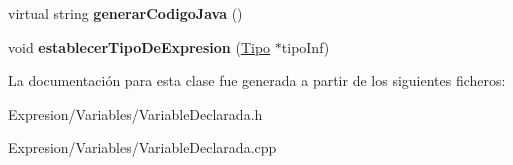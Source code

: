 \begin{DoxyCompactItemize}
\item 
\hypertarget{class_variable_declarada_ace4e1746ca3ebe6fe6a5c45fe2d7314f}{virtual string {\bfseries generar\-Codigo\-Java} ()}\label{class_variable_declarada_ace4e1746ca3ebe6fe6a5c45fe2d7314f}

\item 
\hypertarget{class_variable_declarada_af535502eb197a370d59e91da12fd7f96}{void {\bfseries establecer\-Tipo\-De\-Expresion} (\hyperlink{class_tipo}{Tipo} $\ast$tipo\-Inf)}\label{class_variable_declarada_af535502eb197a370d59e91da12fd7f96}

\end{DoxyCompactItemize}


La documentación para esta clase fue generada a partir de los siguientes ficheros\-:\begin{DoxyCompactItemize}
\item 
Expresion/\-Variables/Variable\-Declarada.\-h\item 
Expresion/\-Variables/Variable\-Declarada.\-cpp\end{DoxyCompactItemize}
